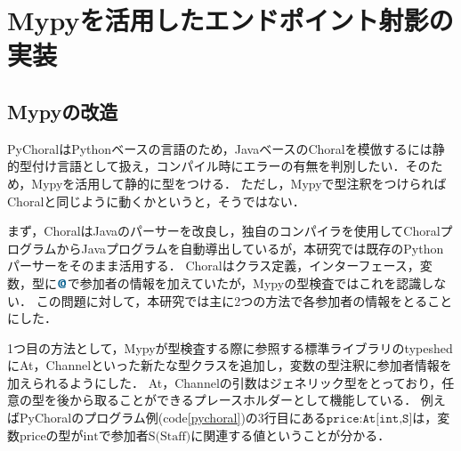 \documentclass{thesis}
\newcommand{\mblue}[1]{\textbf{\textsf{\color{MidnightBlue}#1}}}
\begin{document}
\section{Mypyを活用したエンドポイント射影の実装}
\subsection{Mypyの改造}
PyChoralはPythonベースの言語のため，JavaベースのChoralを模倣するには静的型付け言語として扱え，コンパイル時にエラーの有無を判別したい．そのため，Mypyを活用して静的に型をつける．
ただし，Mypyで型注釈をつけらればChoralと同じように動くかというと，そうではない．

まず，ChoralはJavaのパーサーを改良し，独自のコンパイラを使用してChoralプログラムからJavaプログラムを自動導出しているが，本研究では既存のPythonパーサーをそのまま活用する．
Choralはクラス定義，インターフェース，変数，型に$\mblue{@}$で参加者の情報を加えていたが，Mypyの型検査ではこれを認識しない．
この問題に対して，本研究では主に2つの方法で各参加者の情報をとることにした．

1つ目の方法として，Mypyが型検査する際に参照する標準ライブラリのtypeshedに\textsf{At，Channel}といった新たな型クラスを追加し，変数の型注釈に参加者情報を加えられるようにした．
\textsf{At，Channel}の引数はジェネリック型をとっており，任意の型を後から取ることができるプレースホルダーとして機能している．
例えばPyChoralのプログラム例(code\ref{pychoral})の3行目にある$\texttt{price:At[int,S]}$は，変数$\text{price}$の型が$\text{int}$で参加者$\text{S(Staff)}$に関連する値ということが分かる．
\end{document}
